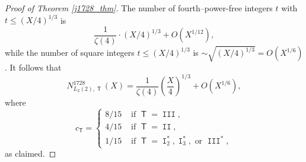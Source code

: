 \documentclass[10pt,a4paper]{amsart}
\DeclareMathOperator{\I}{\mathtt{I}}
\DeclareMathOperator{\II}{\mathtt{II}}
\DeclareMathOperator{\III}{\mathtt{III}}
\newcommand{\T}{\operatorname{\mathsf{T}}}
\begin{document}
\begin{proof}[Proof of Theorem \ref{j1728_thm}]
The number of  fourth--power-free integers $t$ with $t \leq (X/4)^{1/3}$ is  
\[
\frac{1}{\zeta(4)} \cdot \left(X/4\right)^{1/3}  + O(X^{1/12}),
\]
while the number of square integers $t \leq  (X/4)^{1/3}$ is  $\sim \sqrt{(X/4)^{1/3}} = O(X^{1/6})$.  It follows that 
\[
N_{L_2(2),\T}^{1728}(X) = \frac{1}{\zeta(4)} \left(\frac{X}{4}\right)^{1/3} + O(X^{1/6}),
\]
where 
\[
c_{\T} = \begin{cases} 8/15 & \text{ if } \T = \III, \\
4/15 & \text{ if } \T = \II, \\
1/15 & \text{ if } \T = \I_2^*,  \I_3^*, \text{ or } \III^*,\end{cases}
\]
as claimed. 
\end{proof}
\end{document}
